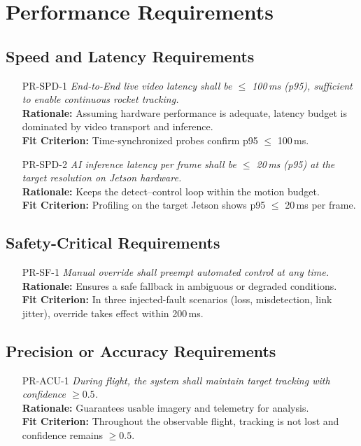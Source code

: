 \documentclass[12pt]{article}
\begin{document}
\section{Performance Requirements}
\subsection{Speed and Latency Requirements}
\begin{itemize}[leftmargin=*]
  \item[PR-SPD-1] \emph{End-to-End live video latency shall be $\leq$ 100\,ms (p95),
          sufficient to enable continuous rocket tracking.}\\ \textbf{Rationale:}
        Assuming hardware performance is adequate, latency budget is dominated by video
        transport and inference.\\ \textbf{Fit Criterion:} Time-synchronized probes
        confirm p95 $\leq$ 100\,ms.

  \item[PR-SPD-2] \emph{AI inference latency per frame shall be $\leq$ 20\,ms (p95) at
          the target resolution on Jetson hardware.}\\ \textbf{Rationale:} Keeps the
        detect–control loop within the motion budget.\\ \textbf{Fit Criterion:}
        Profiling on the target Jetson shows p95 $\leq$ 20\,ms per frame.
\end{itemize}

\subsection{Safety-Critical Requirements}
\begin{itemize}[leftmargin=*]
  \item[PR-SF-1] \emph{Manual override shall preempt automated control at any time.}\\
        \textbf{Rationale:} Ensures a safe fallback in ambiguous or degraded
        conditions.\\ \textbf{Fit Criterion:} In three injected-fault scenarios (loss,
        misdetection, link jitter), override takes effect within 200\,ms.
\end{itemize}

\subsection{Precision or Accuracy Requirements}
\begin{itemize}[leftmargin=*]
  \item[PR-ACU-1] \emph{During flight, the system shall maintain target tracking with
          confidence $\geq 0.5$.}\\ \textbf{Rationale:} Guarantees usable imagery and
        telemetry for analysis.\\ \textbf{Fit Criterion:} Throughout the observable
        flight, tracking is not lost and confidence remains $\geq 0.5$.
\end{itemize}
\end{document}
